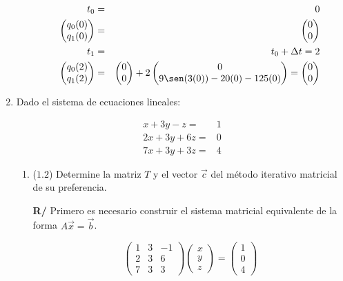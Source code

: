 \documentclass[12pt]{article}
\begin{document}
\begin{enumerate}[leftmargin=*,widest=9]
\begin{enumerate}[label=\alph*]
\begin{eqnarray*}
t_0 & = & 0\\
\begin{pmatrix}
q_0(0) \\ q_1(0)
\end{pmatrix} &=& \begin{pmatrix}
0 \\ 0
\end{pmatrix} \\
t_1 & = & t_0 + \Delta t = 2\\
	\begin{pmatrix}
		q_0(2) \\ q_1(2)
	\end{pmatrix} &=& \begin{pmatrix}
						0\\0
					\end{pmatrix} + 2 \begin{pmatrix}
											0\\ 9\sen(3(0)) - 20(0) - 125(0)
										\end{pmatrix} = \begin{pmatrix}
															0 \\ 0
														\end{pmatrix}
\end{eqnarray*}

    \end{enumerate}

    \item Dado el sistema de ecuaciones lineales:

\begin{align*}
    x + 3y-z =& 1 \\
    2x + 3y + 6z =& 0 \\
    7x + 3y + 3z =& 4
    \end{align*}

    \begin{enumerate}[label=\alph*]

    \item (\(1.2\)) Determine la matriz \(T\) y el vector \(\vec{c}\) del método iterativo matricial de su preferencia.
    
    \textbf{R/} Primero es necesario construir el sistema matricial equivalente de la forma \(A\vec{x}=\vec{b}\).
    
    \[ 
    \begin{pmatrix}
    1 & 3 & -1\\
    2 & 3 & 6 \\
    7 & 3 & 3
    \end{pmatrix} \begin{pmatrix}
    x\\ y\\ z
    \end{pmatrix} = \begin{pmatrix}
    1\\ 0\\ 4
    \end{pmatrix}
    \]


\end{enumerate}
\end{enumerate}
\end{document}
